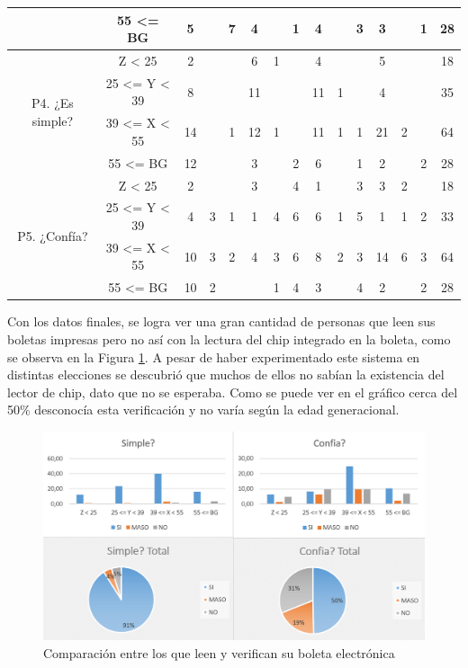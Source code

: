 \begin{table}[h!]
\begin{center}
{\begin{tabular}{ |c|c||c|c|c||c|c|c||c|c|c||c|c|c|c| }
 & 55 <= BG & 5 &\cellcolor{gray} & 7 & 4 &\cellcolor{gray} & 1 & 4 &\cellcolor{gray} & 3 & 3 &\cellcolor{gray} & 1 & 28\\ 
 \hline \hline
 \multirow{4}{3em}{P4. ¿Es simple?} & Z < 25 & 2 & & & 6 & 1 & & 4 & & & 5 & & & 18 \\ 
 & 25 <= Y < 39 & 8 & & & 11 & & & 11 & 1 & & 4 & & & 35 \\ 
 & 39 <= X < 55 & 14 & & 1 & 12 & 1 & & 11 & 1 & 1 & 21 & 2 & & 64 \\
 & 55 <= BG & 12 & & & 3 & & 2 & 6 & & 1 & 2 & & 2 & 28 \\ 
 \hline \hline
 \multirow{4}{3em}{P5. ¿Confía?} & Z < 25 & 2 & & & 3 & & 4 & 1 & & 3 & 3 & 2 & & 18 \\ 
 & 25 <= Y < 39 & 4 & 3 & 1 & 1 & 4 & 6 & 6 & 1 & 5 & 1 & 1 & 2 & 33 \\ 
 & 39 <= X < 55 & 10 & 3 & 2 & 4 & 3 & 6 & 8 & 2 & 3 & 14 & 6 & 3 & 64\\
 & 55 <= BG & 10 & 2 & & & 1 & 4 & 3 & & 4 & 2 & & 2 & 28\\ 
 \hline \hline
\end{tabular}
}
\label{tab:encuesta}
\end{center}
\end{table}

Con los datos finales, se logra ver una gran cantidad de personas que leen sus boletas impresas pero no así con la lectura del chip integrado en la boleta, como se observa en la Figura \ref{graf:votantes}. A pesar de haber experimentado este sistema en distintas elecciones se descubrió que muchos de ellos no sabían la existencia del lector de chip, dato que no se esperaba. Como se puede ver en el gráfico cerca del 50\% desconocía esta verificación y no varía según la edad generacional.

\begin{figure}[h!]
  \includegraphics[width=\textwidth]{img/wJTgsdwuNh.png}
  \caption{Comparación entre los que leen y verifican su boleta electrónica}
  \label{graf:votantes}
\end{figure}

